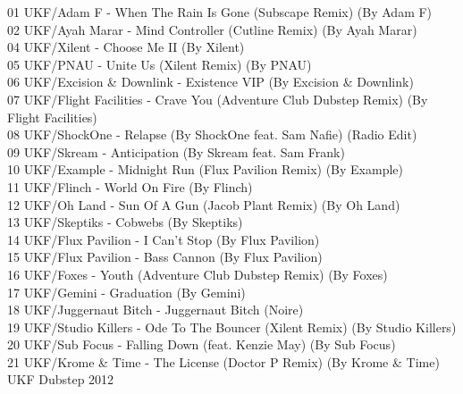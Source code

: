 \begin{multicols}{2}
 01 UKF/Adam F - When The Rain Is Gone (Subscape Remix) (By Adam F)\\ 02 UKF/Ayah Marar - Mind Controller (Cutline Remix) (By Ayah Marar)\\ 04 UKF/Xilent - Choose Me II (By Xilent)\\ 05 UKF/PNAU - Unite Us (Xilent Remix) (By PNAU)\\ 06 UKF/Excision \& Downlink - Existence VIP (By Excision \& Downlink)\\ 07 UKF/Flight Facilities - Crave You (Adventure Club Dubstep Remix) (By Flight Facilities)\\ 08 UKF/ShockOne - Relapse (By ShockOne feat. Sam Nafie) (Radio Edit)\\ 09 UKF/Skream - Anticipation (By Skream feat. Sam Frank)\\ 10 UKF/Example - Midnight Run (Flux Pavilion Remix) (By Example)\\ 11 UKF/Flinch - World On Fire (By Flinch)\\ 12 UKF/Oh Land - Sun Of A Gun (Jacob Plant Remix) (By Oh Land)\\ 13 UKF/Skeptiks - Cobwebs (By Skeptiks)\\ 14 UKF/Flux Pavilion - I Can't Stop (By Flux Pavilion)\\ 15 UKF/Flux Pavilion - Bass Cannon (By Flux Pavilion)\\ 16 UKF/Foxes - Youth (Adventure Club Dubstep Remix) (By Foxes)\\ 17 UKF/Gemini - Graduation (By Gemini)\\ 18 UKF/Juggernaut Bitch - Juggernaut Bitch (Noire)\\ 19 UKF/Studio Killers - Ode To The Bouncer (Xilent Remix) (By Studio Killers)\\ 20 UKF/Sub Focus - Falling Down (feat. Kenzie May) (By Sub Focus)\\ 21 UKF/Krome \& Time - The License (Doctor P Remix) (By Krome \& Time)\\
 \large UKF Dubstep 2012 \normalsize\\

\end{multicols}
